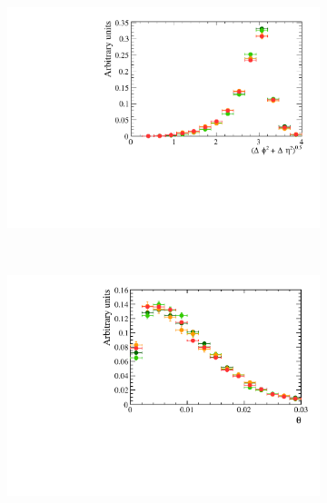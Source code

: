 \begin{figure}
    \centering
    \begin{subfigure}[b]{0.48\textwidth}
        \includegraphics[width=\textwidth]{./Figs/Appendix1/bkgnf_DeltaR.pdf}
    \end{subfigure}
    ~ %
    \begin{subfigure}[b]{0.48\textwidth}
       \includegraphics[width=\textwidth]{./Figs/Appendix1/bkgnd_DIRA.pdf}
    \end{subfigure}




\end{figure}
